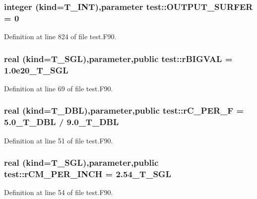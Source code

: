 \hypertarget{namespacetest_a19efe476537676b4902cb464d566af6f}{
\subsubsection[{OUTPUT\_\-SURFER}]{\setlength{\rightskip}{0pt plus 5cm}integer (kind={\bf T\_\-INT}),parameter {\bf test::OUTPUT\_\-SURFER} = 0}}
\label{namespacetest_a19efe476537676b4902cb464d566af6f}


Definition at line 824 of file test.F90.

\hypertarget{namespacetest_ac6f2875c79f3dc5f3058945c798787da}{
\subsubsection[{rBIGVAL}]{\setlength{\rightskip}{0pt plus 5cm}real (kind={\bf T\_\-SGL}),parameter,public {\bf test::rBIGVAL} = 1.0e20\_\-T\_\-SGL}}
\label{namespacetest_ac6f2875c79f3dc5f3058945c798787da}


Definition at line 69 of file test.F90.

\hypertarget{namespacetest_a95fd1d84e61f442438a5e81b15c00185}{
\subsubsection[{rC\_\-PER\_\-F}]{\setlength{\rightskip}{0pt plus 5cm}real (kind={\bf T\_\-DBL}),parameter,public {\bf test::rC\_\-PER\_\-F} = 5.0\_\-T\_\-DBL / 9.0\_\-T\_\-DBL}}
\label{namespacetest_a95fd1d84e61f442438a5e81b15c00185}


Definition at line 51 of file test.F90.

\hypertarget{namespacetest_a99c086ce41f7f593657b86272536caa1}{
\subsubsection[{rCM\_\-PER\_\-INCH}]{\setlength{\rightskip}{0pt plus 5cm}real (kind={\bf T\_\-SGL}),parameter,public {\bf test::rCM\_\-PER\_\-INCH} = 2.54\_\-T\_\-SGL}}
\label{namespacetest_a99c086ce41f7f593657b86272536caa1}


Definition at line 54 of file test.F90.

